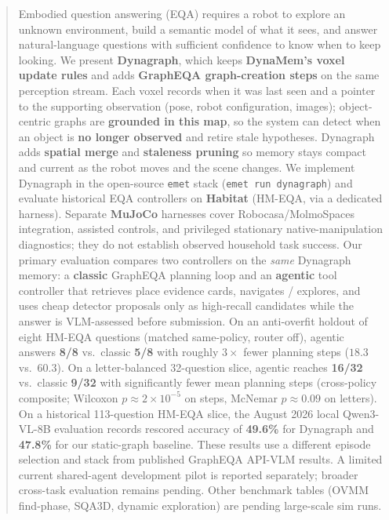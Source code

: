 \begin{abstract}
Embodied question answering (EQA) requires a robot to explore an unknown environment, build a semantic model of what it sees, and answer natural-language questions with sufficient confidence to know when to keep looking.
We present \textbf{Dynagraph}, which keeps \textbf{DynaMem's voxel update rules} and adds \textbf{GraphEQA graph-creation steps} on the same perception stream.
Each voxel records when it was last seen and a pointer to the supporting observation (pose, robot configuration, images); object-centric graphs are \textbf{grounded in this map}, so the system can detect when an object is \textbf{no longer observed} and retire stale hypotheses.
Dynagraph adds \textbf{spatial merge} and \textbf{staleness pruning} so memory stays compact and current as the robot moves and the scene changes.
We implement Dynagraph in the open-source \texttt{emet} stack (\texttt{emet run dynagraph}) and evaluate historical EQA controllers on \textbf{Habitat} (HM-EQA, via a dedicated harness). Separate \textbf{MuJoCo} harnesses cover Robocasa/MolmoSpaces integration, assisted controls, and privileged stationary native-manipulation diagnostics; they do not establish observed household task success.
Our primary evaluation compares two controllers on the \emph{same} Dynagraph memory: a \textbf{classic} GraphEQA planning loop and an \textbf{agentic} tool controller that retrieves place evidence cards, navigates / explores, and uses cheap detector proposals only as high-recall candidates while the answer is VLM-assessed before submission.
On an anti-overfit holdout of eight HM-EQA questions (matched same-policy, router off), agentic answers \textbf{8/8} vs.\ classic \textbf{5/8} with roughly $3\times$ fewer planning steps ($18.3$ vs.\ $60.3$).
On a letter-balanced 32-question slice, agentic reaches \textbf{16/32} vs.\ classic \textbf{9/32} with significantly fewer mean planning steps (cross-policy composite; Wilcoxon $p{\approx}2{\times}10^{-5}$ on steps, McNemar $p{\approx}0.09$ on letters).
On a historical 113-question HM-EQA slice, the August 2026 local Qwen3-VL-8B evaluation records rescored accuracy of \textbf{49.6\%} for Dynagraph and \textbf{47.8\%} for our static-graph baseline. These results use a different episode selection and stack from published GraphEQA API-VLM results. A limited current shared-agent development pilot is reported separately; broader cross-task evaluation remains pending.
Other benchmark tables (OVMM find-phase, SQA3D, dynamic exploration) are pending large-scale sim runs.
\end{abstract}
